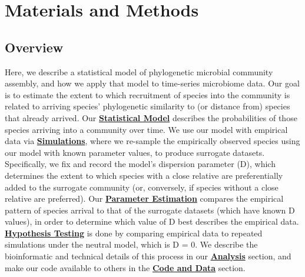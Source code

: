 \documentclass{article}
\begin{document}
\section{Materials and Methods}

\subsection{Overview} \label{sec:overview}
Here, we describe a statistical model of phylogenetic microbial community assembly, and how we apply that model to time-series microbiome data. Our goal is to estimate the extent to which recruitment of species into the community is related to arriving species’ phylogenetic similarity to (or distance from) species that already arrived. Our \hyperref[sec:statisticalModel]{\textbf{Statistical Model}} describes the probabilities of those species arriving into a community over time. We use our model with empirical data via \hyperref[sec:simulations]{\textbf{Simulations}}, where we re-sample the empirically observed species using our model with known parameter values, to produce surrogate datasets. Specifically, we fix and record the model’s dispersion parameter (D), which determines the extent to which species with a close relative are preferentially added to the surrogate community (or, conversely, if species without a close relative are preferred). Our \hyperref[sec:parameterEstimation]{\textbf{Parameter Estimation}} compares the empirical pattern of species arrival to that of the surrogate datasets (which have known D values), in order to determine which value of D best describes the empirical data. \hyperref[sec:hypothesisTesting]{\textbf{Hypothesis Testing}} is done by comparing empirical data to repeated simulations under the neutral model, which is D = 0. We describe the bioinformatic and technical details of this process in our \hyperref[sec:analysis]{\textbf{Analysis}} section, and make our code available to others in the \hyperref[sec:codeAndData]{\textbf{Code and Data}} section. 
\end{document}
